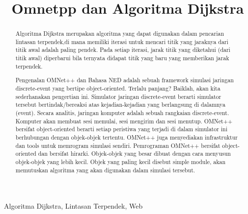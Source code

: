 \documentclass[conference]{IEEEtran}
\begin{document}
\title{Omnetpp dan Algoritma Dijkstra}

\author{
\and

\and
}
\maketitle

\begin{abstract}
    Algoritma Dijkstra merupakan algoritma yang dapat digunakan dalam
    pencarian lintasan terpendek,di mana memiliki iterasi untuk mencari titik yang jaraknya
    dari titik awal adalah paling pendek. Pada setiap iterasi, jarak titik yang diketahui (dari titik
    awal) diperbarui bila ternyata didapat titik yang baru yang memberikan jarak terpendek.
\end{abstract}
\begin{abstract}
Pengenalan OMNet++ dan Bahasa NED
adalah sebuah framework simulasi jaringan discrete-event yang bertipe object-oriented. Terlalu panjang? Baiklah, akan kita sederhanakan pengertian ini.
Simulator jaringan discrete-event berarti simulator tersebut bertindak/bereaksi atas kejadian-kejadian yang berlangsung di dalamnya (event). Secara analitis, jaringan komputer adalah sebuah rangkaian discrete-event. Komputer akan membuat sesi memulai, sesi mengirim dan sesi menutup. OMNet++ bersifat object-oriented berarti setiap peristiwa yang terjadi di dalam simulator ini berhubungan dengan objek-objek tertentu.
OMNet++ juga menyediakan infrastruktur dan tools untuk memrogram simulasi sendiri. Pemrograman OMNet++ bersifat object-oriented dan bersifat hirarki. Objek-objek yang besar dibuat dengan cara menyusun objek-objek yang lebih kecil. Objek yang paling kecil disebut simple module, akan memutuskan algoritma yang akan digunakan dalam simulasi tersebut.
\end{abstract}
\begin{IEEEkeywords}
    Algoritma Dijkstra, Lintasan Terpendek, Web
\end{IEEEkeywords}
\end{document}
